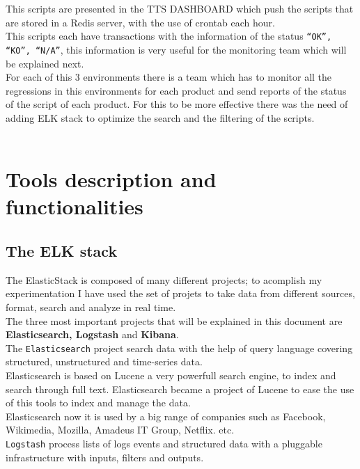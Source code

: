 This scripts are presented in the TTS DASHBOARD which push the scripts that are stored in a Redis server, with the use of crontab each hour. \\

This scripts each have transactions with the information of the status \texttt{“OK”, “KO”, “N/A”}, this information is very useful for the monitoring team which will be explained next.\\

For each of this 3 environments there is a team which has to monitor all the regressions in this environments for each product and send reports of the status of the script of each product. For this to be more effective there was the need of adding ELK stack to optimize the search and the filtering of the scripts. \\ 
\\

\chapter{Tools description and functionalities}
\section{The ELK stack}

The ElasticStack is composed of many different projects; to acomplish my experimentation I have used the set of projets to take data from different sources, format, search and analyze in real time. \\

The three most important projects that will be explained in this document are \textbf{Elasticsearch, Logstash} and \textbf{Kibana}. \\ 

The \texttt{Elasticsearch} project search data with the help of query language covering structured, unstructured and time-series data. \\ 

Elasticsearch is based on Lucene a very powerfull search engine, to index and search through full text. Elasticsearch became a project of Lucene to ease the use of this tools to index and manage the data.
\\

Elasticsearch now it is used by a big range of companies such as Facebook, Wikimedia, Mozilla, Amadeus IT Group, Netflix. etc. 
\\

\texttt{Logstash} process lists of logs events and structured data with a pluggable infrastructure with inputs, filters and outputs. \\ 

